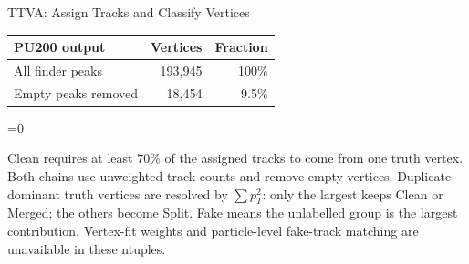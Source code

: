 \documentclass[xcolor=table,aspectratio=169]{beamer}
\providecommand{\talkbuild}{0}
\newcommand{\readingonly}[1]{\ifnum\talkbuild=0\relax#1\fi}
\newcommand{\readingnote}[1]{\readingonly{\par\vspace{.35em}%
  {\footnotesize\color{black!65}#1\par}}}
\begin{document}
\begin{frame}{TTVA: Assign Tracks and Classify Vertices}
{{}\par}\par\vspace{.3em}
{\centering\footnotesize
\begin{tabular}{lrr}\toprule
PU200 output & Vertices & Fraction\\\midrule
All finder peaks & 193,945 & 100\%\\
Empty peaks removed & 18,454 & 9.5\%\\\bottomrule
\end{tabular}\par}\readingnote{Clean requires at least 70\% of the assigned tracks to come from one truth vertex. Both chains use unweighted track counts and remove empty vertices. Duplicate dominant truth vertices are resolved by $\sum p_T^2$: only the largest keeps Clean or Merged; the others become Split. Fake means the unlabelled group is the largest contribution. Vertex-fit weights and particle-level fake-track matching are unavailable in these ntuples.}
\end{frame}
\end{document}
